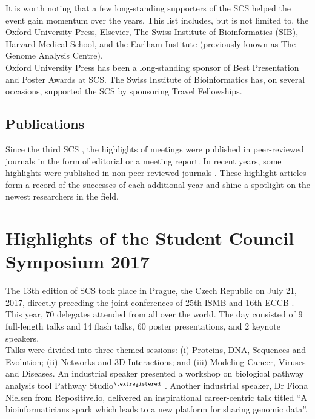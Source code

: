 \documentclass[]{article}%
\begin{document}
	It is worth noting that a few long-standing supporters of the SCS helped the event gain momentum over the years. This list includes, but is not limited to, the Oxford University Press, Elsevier, The Swiss Institute of Bioinformatics (SIB), Harvard Medical School, and the Earlham Institute (previously known as The Genome Analysis Centre). \\
	
	Oxford University Press has been a long-standing sponsor of Best Presentation and Poster Awards at SCS. The Swiss Institute of Bioinformatics has, on several occasions,  supported the SCS by sponsoring Travel Fellowships.\\
	
	
	\subsection*{Publications}
	
	Since the third SCS \citep{Gehlenborg2007}, the highlights of meetings were published in peer-reviewed journals in the form of editorial or a meeting report. In recent years, some highlights were published in non-peer reviewed journals \citep{scpub}. These highlight articles form a record of the successes of each additional year and shine a spotlight on the newest researchers in the field. \\
	
	\section*{Highlights of the Student Council Symposium 2017}
	
	The 13th edition of SCS took place in Prague, the Czech Republic on July 21, 2017, directly preceding the joint conferences of 25th ISMB and 16th ECCB \citep{ismb2017}. This year, 70 delegates attended from all over the world. The day consisted of 9 full-length talks and 14 flash talks, 60 poster presentations, and 2 keynote speakers.\\
	
	Talks were divided into three themed sessions: (i) Proteins, DNA, Sequences and Evolution; (ii) Networks and 3D Interactions; and (iii) Modeling Cancer, Viruses and Diseases. An industrial speaker presented a workshop on biological pathway analysis tool Pathway Studio$^{\tiny{\textregistered}}$ \citep{Nikitin2003, pathwaystudio}. Another industrial speaker, Dr Fiona Nielsen from Repositive.io, delivered an inspirational career-centric talk titled “A bioinformaticians spark which leads to a new platform for sharing genomic data”.\\
	
\end{document}

